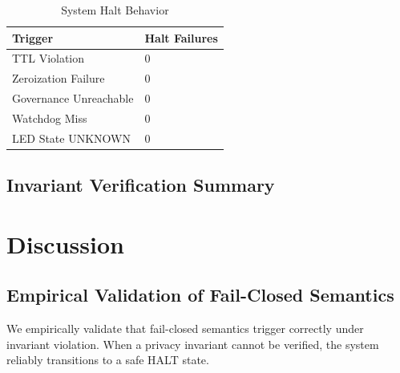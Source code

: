\documentclass[conference]{IEEEtran}
\begin{document}
\begin{table}[htbp]
\caption{System Halt Behavior}
\centering
\begin{tabular}{l l}
\toprule
\textbf{Trigger} & \textbf{Halt Failures} \\
\midrule
TTL Violation & 0 \\
Zeroization Failure & 0 \\
Governance Unreachable & 0 \\
Watchdog Miss & 0 \\
LED State UNKNOWN & 0 \\
\bottomrule
\end{tabular}
\label{tab:halt}
\end{table}

\subsection{Invariant Verification Summary}

\begin{table}[htbp]
\caption{Invariant Verification}
\centering
{}
\label{tab:invariants}
\end{table}

\section{Discussion}

\subsection{Empirical Validation of Fail-Closed Semantics}
We empirically validate that fail-closed semantics trigger correctly under invariant violation. When a privacy invariant cannot be verified, the system reliably transitions to a safe HALT state.
\end{document}

